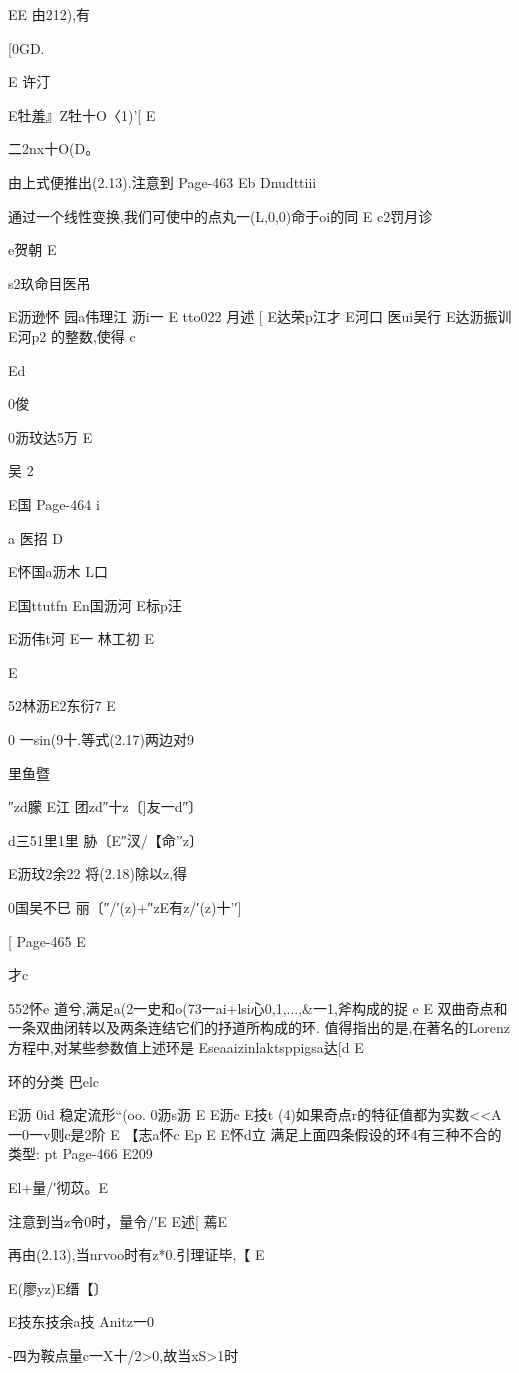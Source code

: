 {{{{EE
由212),有

[0GD.

E
许汀

E牡羞』Z牡十O〈1)'[
E

二2nx十O(D。

由上式便推出(2.13).注意到
Page-463
Eb
Dnudttiii

通过一个线性变换,我们可使中的点丸一(L,0,0)命于oi的同
E
c2罚月诊

e贺朝
E

s2玖命目医吊

E沥逊怀
园a伟理江
沥i一
E
tto022
月述
[
E达荣p江才
E河口
医ui吴行
E达沥振训
E河p2
的整数,使得
c

Ed

0俊

0沥玟达5万
E

吴
2

E国
Page-464
i

a
医招
D

E怀国a沥木
L口

E国ttutfn
En国沥河
E标p汪

E沥伟t河
E一
林工初
E

E

52林沥E2东衍7
E

0
一sin(9十.等式(2.17)两边对9

里鱼暨

″zd朦
E江
团zd″十z〔]友一d″〕

d三51里1里
胁〔E″汊/【命'′z〕

E沥玟2余22
将(2.18)除以z,得

0国吴不巳
丽〔″/′(z)+″zE有z/′(z)十'′]

[
Page-465
E

才c

552怀e
道兮,满足a(2一史和o(73一ai+lsi心0,1,...,&一1,斧构成的捉
e
E
双曲奇点和一条双曲闭转以及两条连结它们的抒道所构成的环.
值得指出的是,在著名的Lorenz方程中,对某些参数值上述环是
Eseaaizinlaktsppigsa达[d
E

环的分类
巴elc

E沥
0id
稳定流形“(oo.
0沥s沥
E
E沥c
E技t
(4)如果奇点r的特征值都为实数<<A一0一v则c是2阶
E
【志a怀c
Ep
E
E怀d立
满足上面四条假设的环4有三种不合的类型:
pt
Page-466
E209

El+量/′彻苡。E

注意到当z令0时，量令/′E
E述[
蔫E

再由(2.13),当nrvoo时有z*0.引理证毕,【
E

E{(廖yz)E缙【〕}

E技东技余a技
Anitz一0}-四为鞍点量c一X十/2>0,故当xS>1时

}}}
